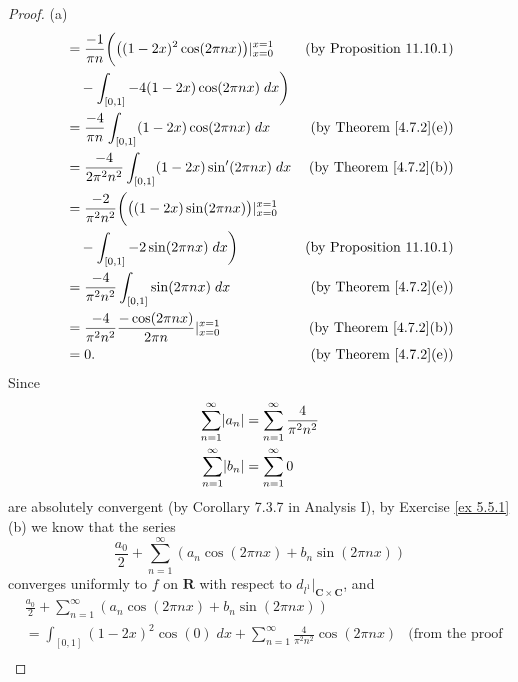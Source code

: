 \begin{proof}{(a)}
\begin{align*}
            & = \frac{-1}{\pi n} \bigg(\big((1 - 2x)^2 \cos(2 \pi n x)\big)|_{x = 0}^{x = 1}   & \text{(by Proposition 11.10.1)}     \\
            & \quad - \int_{[0, 1]} -4 (1 - 2x) \cos(2 \pi n x) \; dx\bigg)                                                          \\
            & = \frac{-4}{\pi n} \int_{[0, 1]} (1 - 2x) \cos(2 \pi n x) \; dx                  & \text{(by Theorem \ref{4.7.2}(e))}  \\
            & = \frac{-4}{2 \pi^2 n^2} \int_{[0, 1]} (1 - 2x) \sin'(2 \pi n x) \; dx           & \text{(by Theorem \ref{4.7.2}(b))}  \\
            & = \frac{-2}{\pi^2 n^2} \bigg(\big((1 - 2x) \sin(2 \pi n x)\big)|_{x = 0}^{x = 1}                                       \\
            & \quad - \int_{[0, 1]} -2 \sin(2 \pi n x) \; dx\bigg)                             & \text{(by Proposition 11.10.1)}     \\
            & = \frac{-4}{\pi^2 n^2} \int_{[0, 1]} \sin(2 \pi n x) \; dx                       & \text{(by Theorem \ref{4.7.2}(e))}  \\
            & = \frac{-4}{\pi^2 n^2} \frac{-\cos(2 \pi n x)}{2 \pi n}|_{x = 0}^{x = 1}         & \text{(by Theorem \ref{4.7.2}(b))}  \\
            & = 0.                                                                             & \text{(by Theorem \ref{4.7.2}(e))}
    \end{align*}
    Since
    \begin{align*}
        \sum_{n = 1}^\infty \abs*{a_n} & = \sum_{n = 1}^\infty \frac{4}{\pi^2 n^2} \\
        \sum_{n = 1}^\infty \abs*{b_n} & = \sum_{n = 1}^\infty 0
    \end{align*}
    are absolutely convergent (by Corollary 7.3.7 in Analysis I), by Exercise \ref{ex 5.5.1}(b) we know that the series
    \[
        \frac{a_0}{2} + \sum_{n = 1}^\infty (a_n \cos(2 \pi n x) + b_n \sin(2 \pi n x))
    \]
    converges uniformly to \(f\) on \(\mathbf{R}\) with respect to \(d_{l^1}|_{\mathbf{C} \times \mathbf{C}}\), and
    \begin{align*}
         & \frac{a_0}{2} + \sum_{n = 1}^\infty (a_n \cos(2 \pi n x) + b_n \sin(2 \pi n x))                                                                                                  \\
         & = \int_{[0, 1]} (1 - 2x)^2 \cos(0) \; dx + \sum_{n = 1}^\infty \frac{4}{\pi^2 n^2} \cos(2 \pi n x)                                          & \text{(from the proof above)}      \\

\end{align*}
\end{proof}
